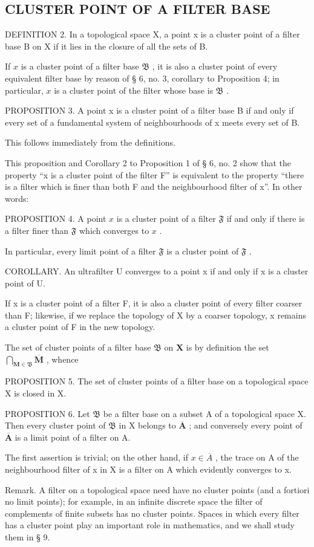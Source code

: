 \subsection{CLUSTER POINT OF A FILTER BASE}

DEFINITION 2. In a topological space X, a point x is a cluster point of a filter base B on X if it lies in the closure of all the sets of B.

If \(x\) is a cluster point of a filter base \(\mathfrak{B}\) , it is also a cluster point of every equivalent filter base by reason of § 6, no. 3, corollary to Proposition 4; in particular, \(x\) is a cluster point of the filter whose base is \(\mathfrak{B}\) .

PROPOSITION 3. A point x is a cluster point of a filter base B if and only if every set of a fundamental system of neighbourhoods of x meets every set of B.

This follows immediately from the definitions.

This proposition and Corollary 2 to Proposition 1 of § 6, no. 2 show that the property ``x is a cluster point of the filter F'' is equivalent to the property ``there is a filter which is finer than both F and the neighbourhood filter of x''. In other words:

PROPOSITION 4. A point \(x\) is a cluster point of a filter \(\mathfrak{F}\) if and only if there is a filter finer than \(\mathfrak{F}\) which converges to \(x\) .

In particular, every limit point of a filter \(\mathfrak{F}\) is a cluster point of \(\mathfrak{F}\) .

COROLLARY. An ultrafilter U converges to a point x if and only if x is a cluster point of U.

If x is a cluster point of a filter F, it is also a cluster point of every filter coarser than F; likewise, if we replace the topology of X by a coarser topology, x remains a cluster point of F in the new topology.

The set of cluster points of a filter base \(\mathfrak{B}\) on \(\mathbf{X}\) is by definition the set \(\bigcap_{\mathbf{M} \in \mathfrak{B}} \overline{\mathbf{M}}\) , whence

PROPOSITION 5. The set of cluster points of a filter base on a topological space X is closed in X.

PROPOSITION 6. Let \(\mathfrak{B}\) be a filter base on a subset A of a topological space X. Then every cluster point of \(\mathfrak{B}\) in X belongs to \(\overline{\mathbf{A}}\) ; and conversely every point of \(\overline{\mathbf{A}}\) is a limit point of a filter on A.

The first assertion is trivial; on the other hand, if \(x \in \overline{A}\) , the trace on A of the neighbourhood filter of x in X is a filter on A which evidently converges to x.

Remark. A filter on a topological space need have no cluster points (and a fortiori no limit points); for example, in an infinite discrete space the filter of complements of finite subsets has no cluster points. Spaces in which every filter has a cluster point play an important role in mathematics, and we shall study them in § 9.

